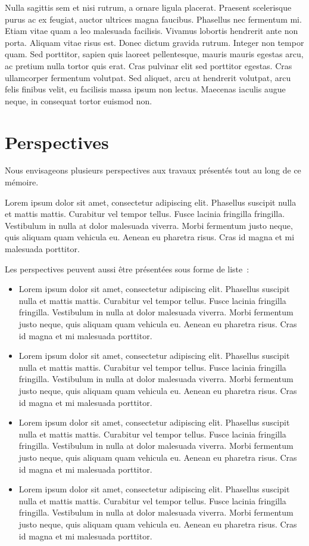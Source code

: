 Nulla sagittis sem et nisi rutrum, a ornare ligula placerat. Praesent scelerisque purus ac ex feugiat, auctor ultrices magna faucibus. 
Phasellus nec fermentum mi. Etiam vitae quam a leo malesuada facilisis. Vivamus lobortis hendrerit ante non porta. 
Aliquam vitae risus est. Donec dictum gravida rutrum. Integer non tempor quam. 
Sed porttitor, sapien quis laoreet pellentesque, mauris mauris egestas arcu, ac pretium nulla tortor quis erat. 
Cras pulvinar elit sed porttitor egestas. Cras ullamcorper fermentum volutpat. 
Sed aliquet, arcu at hendrerit volutpat, arcu felis finibus velit, eu facilisis massa ipsum non lectus. 
Maecenas iaculis augue neque, in consequat tortor euismod non. 

\section{Perspectives}
Nous envisageons plusieurs perspectives aux travaux présentés tout au long de ce mémoire.

Lorem ipsum dolor sit amet, consectetur adipiscing elit. Phasellus suscipit nulla et mattis mattis. Curabitur vel tempor tellus. 
Fusce lacinia fringilla fringilla. Vestibulum in nulla at dolor malesuada viverra. Morbi fermentum justo neque, quis aliquam quam vehicula eu. 
Aenean eu pharetra risus. Cras id magna et mi malesuada porttitor.

Les perspectives peuvent aussi être présentées sous forme de liste~:
\begin{itemize}
\item Lorem ipsum dolor sit amet, consectetur adipiscing elit. Phasellus suscipit nulla et mattis mattis. Curabitur vel tempor tellus. 
Fusce lacinia fringilla fringilla. Vestibulum in nulla at dolor malesuada viverra. Morbi fermentum justo neque, quis aliquam quam vehicula eu. 
Aenean eu pharetra risus. Cras id magna et mi malesuada porttitor.

\item Lorem ipsum dolor sit amet, consectetur adipiscing elit. Phasellus suscipit nulla et mattis mattis. Curabitur vel tempor tellus. 
Fusce lacinia fringilla fringilla. Vestibulum in nulla at dolor malesuada viverra. Morbi fermentum justo neque, quis aliquam quam vehicula eu. 
Aenean eu pharetra risus. Cras id magna et mi malesuada porttitor.

\item Lorem ipsum dolor sit amet, consectetur adipiscing elit. Phasellus suscipit nulla et mattis mattis. Curabitur vel tempor tellus. 
Fusce lacinia fringilla fringilla. Vestibulum in nulla at dolor malesuada viverra. Morbi fermentum justo neque, quis aliquam quam vehicula eu. 
Aenean eu pharetra risus. Cras id magna et mi malesuada porttitor.

\item Lorem ipsum dolor sit amet, consectetur adipiscing elit. Phasellus suscipit nulla et mattis mattis. Curabitur vel tempor tellus. 
Fusce lacinia fringilla fringilla. Vestibulum in nulla at dolor malesuada viverra. Morbi fermentum justo neque, quis aliquam quam vehicula eu. 
Aenean eu pharetra risus. Cras id magna et mi malesuada porttitor.
\end{itemize}
